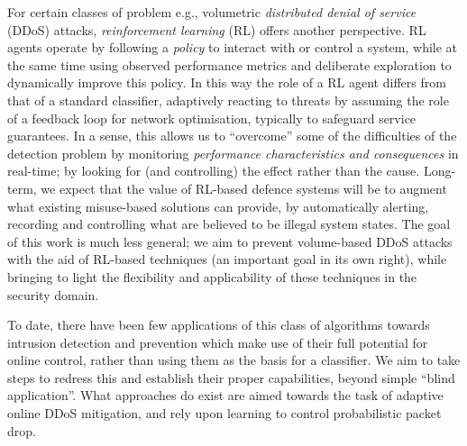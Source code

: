 \documentclass[10pt, times, comsoc]{IEEEtran}
\begin{document}
For certain classes of problem e.g., volumetric \emph{distributed denial of service} (DDoS) attacks, \emph{reinforcement learning} (RL) offers another perspective.
RL agents operate by following a \emph{policy} to interact with or control a system, while at the same time using observed performance metrics and deliberate exploration to dynamically improve this policy.
In this way the role of a RL agent differs from that of a standard classifier, adaptively reacting to threats by assuming the role of a feedback loop for network optimisation, typically to safeguard service guarantees.
In a sense, this allows us to ``overcome'' some of the difficulties of the detection problem by monitoring \emph{performance characteristics and consequences} in real-time; by looking for (and controlling) the effect rather than the cause.
Long-term, we expect that the value of RL-based defence systems will be to augment what existing misuse-based solutions can provide, by automatically alerting, recording and controlling what are believed to be illegal system states.
The goal of this work is much less general; we aim to prevent volume-based DDoS attacks with the aid of RL-based techniques (an important goal in its own right), while bringing to light the flexibility and applicability of these techniques in the security domain.

To date, there have been few applications of this class of algorithms towards intrusion detection and prevention which make use of their full potential for online control, rather than using them as the basis for a classifier.
We aim to take steps to redress this and establish their proper capabilities, beyond simple ``blind application''.
What approaches do exist are aimed towards the task of adaptive online DDoS mitigation, and rely upon learning to control probabilistic packet drop.
\end{document}
